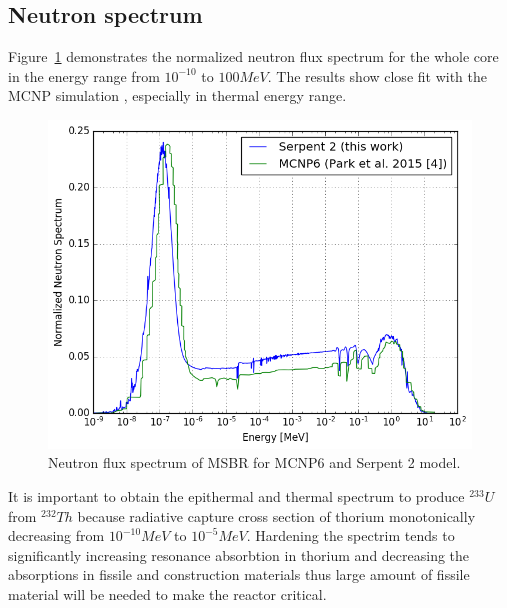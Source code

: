 \documentclass{anstrans}
\begin{document}
\subsection{Neutron spectrum}
Figure~\ref{fig:spectrum} demonstrates the normalized neutron flux spectrum for the whole core in the energy range from $10^{-10}$ to $100 MeV$. The results show close fit with the MCNP simulation \cite{park_whole_2015}, especially in thermal energy range. 
\begin{figure}[h!] %
  \centering
  \includegraphics[width=\linewidth]{figure_3_1.png} 
  \caption{Neutron flux spectrum of MSBR for MCNP6 and Serpent 2 model.}
  \label{fig:spectrum}
\end{figure}
It is important to obtain the epithermal and thermal spectrum to produce $^{233}U$ from $^{232}Th$ because radiative capture cross section of thorium monotonically decreasing from $10^{-10} MeV$ to $10^{-5} MeV$. Hardening the spectrim tends to significantly increasing resonance absorbtion in thorium and decreasing the absorptions in fissile and construction materials thus large amount of fissile material will be needed to make the reactor critical.
\end{document}
